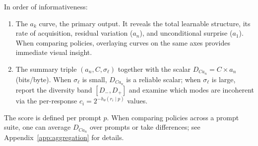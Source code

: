 In order of informativeness:
\begin{enumerate}[nosep]
    \item The $a_k$ curve, the primary output.
It reveals the total learnable structure, its rate of acquisition, residual variation ($a_n$), and unconditional surprise ($a_1$).
When comparing policies, overlaying curves on the same axes provides immediate visual insight.
    \item The summary triple $(a_n, C, \sigma_\ell)$ together with the scalar $D_{Ca_n} = C \times a_n$ (bits/byte).
When $\sigma_\ell$ is small, $D_{Ca_n}$ is a reliable scalar; when $\sigma_\ell$ is large, report the diversity band $[D_-, D_+]$ and examine which modes are incoherent via the per-response $c_i = 2^{-h_\theta(r_i \mid p)}$ values.
\end{enumerate}

The score is defined per prompt $p$.
When comparing policies across a prompt suite, one can average $D_{Ca_n}$ over prompts or take differences; see Appendix~\ref{app:aggregation} for details.

